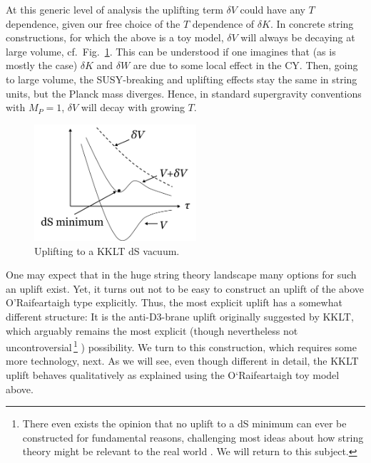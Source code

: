 \documentclass[12pt]{article}
\numberwithin{equation}{section}
\begin{document}
At this generic level of analysis the uplifting term $\delta V$ could have any $T$ dependence, given our free choice of the $T$ dependence of $\delta K$. In concrete string constructions, for which the above is a toy model, $\delta V$ will always be decaying at large volume, cf.~Fig.~\ref{kkltup}. This can be understood if one imagines that (as is mostly the case) $\delta K$ and $\delta W$ are due to some local effect in the CY. Then, going to large volume, the SUSY-breaking and uplifting effects stay the same in string units, but the Planck mass diverges. Hence, in standard supergravity conventions with $M_P=1$, $\delta V$ will decay with growing $T$. 

\begin{figure}[ht]
\begin{center} 
\includegraphics[width=6cm]{kkltup.png}
\caption{Uplifting to a KKLT dS vacuum.}
\label{kkltup} 
\end{center}
\end{figure}

One may expect that in the huge string theory landscape many options for such an uplift exist. Yet, it turns out not to be easy to construct an uplift of the above O'Raifeartaigh type explicitly. Thus, the most explicit uplift has a somewhat different structure: It is the anti-D3-brane uplift originally suggested by KKLT, which arguably remains the most explicit (though nevertheless not uncontroversial$\,$\footnote{
There 
even exists the opinion that no uplift to a dS minimum can ever be constructed for fundamental reasons, challenging most ideas about how string theory might be relevant to the real world \cite{Danielsson:2018ztv,Ooguri:2018wrx}. We will return to this subject.
}
$\!$) possibility. We turn to this construction, which requires some more technology, next. As we will see, even though different in detail, the KKLT uplift behaves qualitatively as explained using the O`Raifeartaigh toy model above.
\end{document}
